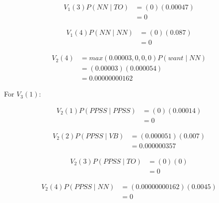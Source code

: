 \documentclass[10pt,a4paper]{article}
\begin{document}
\begin{equation}
\begin{split}
V_1(3)P(NN\mid TO) &= (0)(0.00047) \\
&= 0
\end{split}
\end{equation}

\begin{equation}
\begin{split}
V_1(4)P(NN\mid NN) &= (0)(0.087) \\
 &= 0
\end{split}
\end{equation}

\begin{equation}
\begin{split}
V_2(4) &= max(0.00003,0,0,0)P(want\mid NN) \\
 &=(0.00003)(0.000054) \\
 &=0.00000000162
\end{split}
\end{equation}











For $V_3(1):$

\begin{equation}
\begin{split}
V_2(1)P(PPSS\mid PPSS) &= (0)(0.00014) \\
&= 0
\end{split}
\end{equation}

\begin{equation}
\begin{split}
V_2(2)P(PPSS\mid VB) &= (0.000051)(0.007) \\
 &= 0.000000357
\end{split}
\end{equation}

\begin{equation}
\begin{split}
V_2(3)P(PPSS\mid TO) &= (0)(0) \\
&= 0
\end{split}
\end{equation}

\begin{equation}
\begin{split}
V_2(4)P(PPSS\mid NN) &= (0.00000000162)(0.0045) \\
 &= 0
\end{split}
\end{equation}
\end{document}
